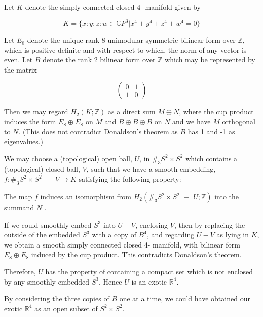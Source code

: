 \documentclass[12pt]{article}
\newcommand {\C} {\mathbb C}
\newcommand {\Z} {\mathbb Z}
\newcommand {\R} {\mathbb R}
\begin{document}
Let $K$ denote the simply connected closed 4- manifold given by 

$$
K=\{x:y:z:w \in \C P^3 | x^4+y^4+z^4+w^4=0\}
$$

Let $E_8$ denote the unique rank 8 unimodular symmetric bilinear form over $\Z$, which is positive definite and with respect to which, the norm of any vector is even. Let $B$ denote  the rank 2 bilinear form over $\Z$ which may be represented by the matrix

$$
\left(\begin{array}{cc} 0&1 \\ 1&0 \end{array}\right)
$$

Then we may regard $H_2(K;\Z)$ as a direct sum $M \oplus N$, where the cup product induces the form $E_8 \oplus E_8$ on $M$ and $B \oplus B \oplus B$ on $N$ and we have $M$ orthogonal to $N$.  (This does not contradict Donaldson's theorem as $B$ has 1 and -1 as eigenvalues.)

We may choose a (topological) open ball, $U$, in $\#_3 S^2 \times S^2$ which contains a (topological) closed ball, $V$, such that we have a smooth embedding, $f:\#_3 S^2 \times S^2\,\, - \,\,V \to K$ satisfying the following property:

The map $f$ induces an isomorphism  from $H_2( \#_3 S^2 \times 
S^2\,\, - \,\,U;\Z)$ into the summand $N$ .



If we could smoothly embed $S^3$ into $U - V$, enclosing $V$, then by replacing the outside of the embedded $S^3$ with a copy of $B^4$, and regarding $U-V$ as 
lying in $K$, we obtain a smooth simply connected closed 4- manifold, with 
bilinear form $E_8 \oplus E_8$ induced by the cup product.  This contradicts Donaldson's theorem.

Therefore, $U$ has the property of containing a compact set which is not enclosed by any smoothly embedded $S^3$.  Hence $U$ is an exotic $\R^4$.

By considering the three copies of $B$ one at a time, we could have obtained our exotic $\R^4$ as an open subset of $S^2 \times S^2$.
\end{document}
